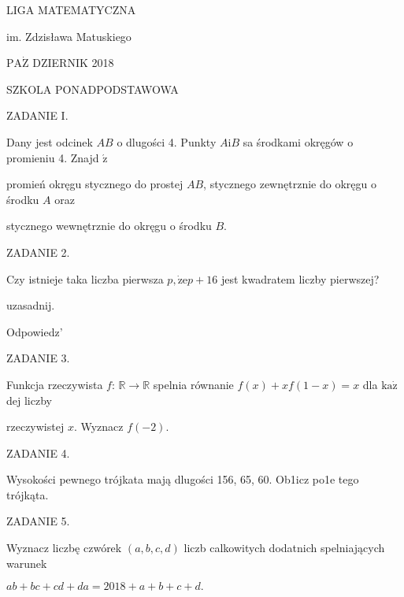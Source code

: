 \documentclass[a4paper,12pt]{article}
\begin{document}
LIGA MATEMATYCZNA

im. Zdzisława Matuskiego

$\mathrm{P}\mathrm{A}\dot{\mathrm{Z}}$ DZIERNIK 2018

SZKOLA PONADPODSTAWOWA

ZADANIE I.

Dany jest odcinek $AB$ o dlugości 4. Punkty $A\mathrm{i}B$ sa środkami okręgów o promieniu 4. Znajd $\acute{\mathrm{z}}$

promień okręgu stycznego do prostej $AB$, stycznego zewnętrznie do okręgu o środku $A$ oraz

stycznego wewnętrznie do okręgu o środku $B.$

ZADANIE 2.

Czy istnieje taka liczba pierwsza $p, \dot{\mathrm{z}}\mathrm{e}p+16$ jest kwadratem liczby pierwszej?

uzasadnij.

Odpowiedz'

ZADANIE 3.

Funkcja rzeczywista $f$: $\mathbb{R} \rightarrow \mathbb{R}$ spelnia równanie $f(x)+xf(1-x) = x$ dla $\mathrm{k}\mathrm{a}\dot{\mathrm{z}}$ dej liczby

rzeczywistej $x$. Wyznacz $f(-2).$

ZADANIE 4.

Wysokości pewnego trójkata mają dlugości 156, 65, 60. Ob1icz po1e tego trójkąta.

ZADANIE 5.

Wyznacz liczbę czwórek $(a,b,c,d)$ liczb calkowitych dodatnich spelniających warunek

$ab+bc+cd+da=2018+a+b+c+d.$
\end{document}

